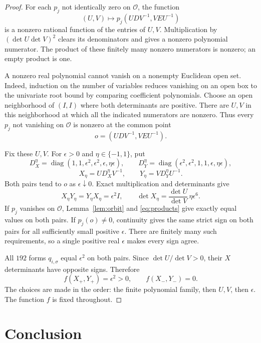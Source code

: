 \documentclass[11pt]{article}
\newcommand{\diag}{\operatorname{diag}}
\begin{document}
\begin{proof}
For each \(p_j\) not identically zero on \(\mathcal O\), the function
\[
 (U,V)\longmapsto p_j(UDV^{-1},VEU^{-1})
\]
is a nonzero rational function of the entries of \(U,V\).
Multiplication by \((\det U\det V)^2\) clears its denominators
and gives a nonzero polynomial numerator. The product of these
finitely many nonzero numerators is nonzero; an empty product is one.

A nonzero real polynomial cannot vanish on a nonempty Euclidean
open set. Indeed, induction on the number of variables reduces
vanishing on an open box to the univariate root bound by comparing
coefficient polynomials. Choose an open neighborhood of \((I,I)\)
where both determinants are positive. There are \(U,V\) in this
neighborhood at which all the indicated numerators are nonzero.
Thus every \(p_j\) not vanishing on \(\mathcal O\) is nonzero at
the common point
\[
 o=(UDV^{-1},VEU^{-1}).
\]

Fix these \(U,V\). For \(\epsilon>0\) and \(\eta\in\{-1,1\}\), put
\[
 D_X^\eta=\diag(1,1,\epsilon^2,\epsilon^2,\epsilon,\eta\epsilon),
 \qquad
 D_Y^\eta=\diag(\epsilon^2,\epsilon^2,1,1,\epsilon,\eta\epsilon),
\]
\[
 X_\eta=UD_X^\eta V^{-1},\qquad
 Y_\eta=VD_Y^\eta U^{-1}.
\]
Both pairs tend to \(o\) as \(\epsilon\downarrow0\). Exact
multiplication and determinants give
\begin{equation}\label{eq:products}
 X_\eta Y_\eta=Y_\eta X_\eta=\epsilon^2I,
 \qquad
 \det X_\eta=\frac{\det U}{\det V}\,\eta\epsilon^6.
\end{equation}
If \(p_j\) vanishes on \(\mathcal O\), Lemma~\ref{lem:orbit}
and \eqref{eq:products} give exactly equal values on both pairs.
If \(p_j(o)\ne0\), continuity gives the same strict sign on both
pairs for all sufficiently small positive \(\epsilon\).
There are finitely many such requirements, so a single positive
real \(\epsilon\) makes every sign agree.

All \(192\) forms \(q_{i,\sigma}\) equal \(\epsilon^2\) on both
pairs. Since \(\det U/\det V>0\), their \(X\) determinants have
opposite signs. Therefore
\[
 f(X_+,Y_+)=\epsilon^2>0,\qquad f(X_-,Y_-)=0.
\]
The choices are made in the order: the finite polynomial family,
then \(U,V\), then \(\epsilon\). The function \(f\) is fixed throughout.
\end{proof}

\section{Conclusion}
\end{document}
